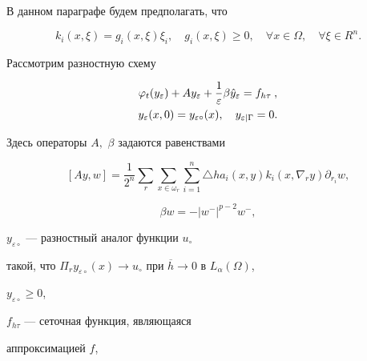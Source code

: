 В данном параграфе будем предполагать, что


\begin{equation}


  k_i(x,\xi) = g_i(x, \xi) \xi_i,\quad  g_i(x,\xi)\ge 0,


\quad\forall x\in\Omega,\quad \forall \xi \in R^n. \label{kk}


\end{equation}





Рассмотрим разностную схему


\begin{gather}


 \varphi _{t}(y_\varepsilon) +  Ay_\varepsilon  +


 \frac{1}{\varepsilon}\beta \Hat{y}_\varepsilon =


f_{h\tau}{\:},\label{4.1}\\


%


 y_\varepsilon(x,0) = y_{\varepsilon\circ}(x),\quad


  y_{\varepsilon \mid \Gamma} = 0.\notag


\end{gather}


Здесь операторы $ A,$ $\beta $  задаются равенствами


$$


[ Ay, w ] = \frac{1}{2^{n}}\sum_{r} \sum^{}_{x\in


\omega_{r}}


\sum^{n}_{i=1} \triangle h a_{i}(x,y)k_{i}(x,\nabla_{r}y)


\partial_{r_{i}} w,


$$


$$


\beta w = -|w^{-}|^{p-2}w^{-},


$$


$ y_{\varepsilon\circ}$ --- разностный аналог функции $u_{\circ}$


такой, что $ \Pi_{r} y_{\varepsilon\circ}(x)


\to u_{\circ} $ при $ \overline{h} \to  0 $ в $L_{\alpha}


(\Omega)$,


$ y_{\varepsilon\circ} \ge 0$,


$f_{h\tau} $ --- сеточная функция, являющаяся


аппроксимацией $f$,




